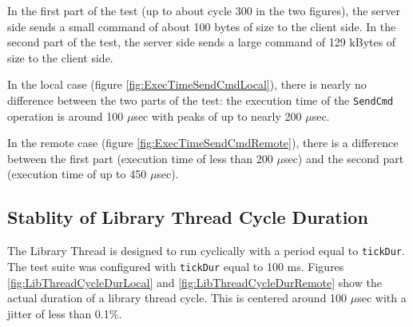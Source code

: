 \documentclass{pnp_article}
\begin{document}
{In the first part of the test (up to about cycle 300 in the two figures), the server side sends a small command of about 100 bytes of size to the client side. In the second part of the test, the server side sends a large command of 129 kBytes of size to the client side.

In the local case (figure \ref{fig:ExecTimeSendCmdLocal}), there is nearly no difference between the two parts of the test: the execution time of the \texttt{SendCmd} operation is around 100 $\mu$sec with peaks of up to nearly 200 $\mu$sec.

In the remote case (figure \ref{fig:ExecTimeSendCmdRemote}), there is a difference between the first part (execution time of less than 200 $\mu$sec) and the second part  (execution time of up to 450 $\mu$sec). 

\subsection{Stablity of Library Thread Cycle Duration}\label{sec:svrDurLibThreadCycle}
The Library Thread is designed to run cyclically with a period equal to \texttt{tickDur}. The test suite was configured with \texttt{tickDur} equal to 100 ms. Figures \ref{fig:LibThreadCycleDurLocal} and \ref{fig:LibThreadCycleDurRemote} show the actual duration of a library thread cycle. This is centered around 100 $\mu$sec with a jitter of less than 0.1\%.












} %
\end{document}
